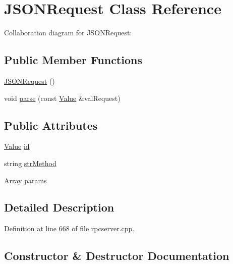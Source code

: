 \hypertarget{class_j_s_o_n_request}{}\section{J\+S\+O\+N\+Request Class Reference}
\label{class_j_s_o_n_request}


Collaboration diagram for J\+S\+O\+N\+Request\+:
\subsection*{Public Member Functions}
\begin{DoxyCompactItemize}
\item 
\hyperlink{class_j_s_o_n_request_a2ce474cfc3eaec1ec8186e7625a2cceb}{J\+S\+O\+N\+Request} ()
\item 
void \hyperlink{class_j_s_o_n_request_a5c68b21e7f1bead9fd39f27208446add}{parse} (const \hyperlink{namespacejson__spirit_a28e6abc99fda7b06c430ca38802527a3}{Value} \&val\+Request)
\end{DoxyCompactItemize}
\subsection*{Public Attributes}
\begin{DoxyCompactItemize}
\item 
\hyperlink{namespacejson__spirit_a28e6abc99fda7b06c430ca38802527a3}{Value} \hyperlink{class_j_s_o_n_request_a511230ee04a067551bafd1ccd9462237}{id}
\item 
string \hyperlink{class_j_s_o_n_request_ace58495b259be69fb4b6e256a42c9d5f}{str\+Method}
\item 
\hyperlink{namespacejson__spirit_aee299e52bda3816039a53210cbbfea1a}{Array} \hyperlink{class_j_s_o_n_request_a92b1bcc9caa57cec01ccdb498a2b3666}{params}
\end{DoxyCompactItemize}


\subsection{Detailed Description}


Definition at line 668 of file rpcserver.\+cpp.



\subsection{Constructor \& Destructor Documentation}
\hypertarget{class_j_s_o_n_request_a2ce474cfc3eaec1ec8186e7625a2cceb}{}
